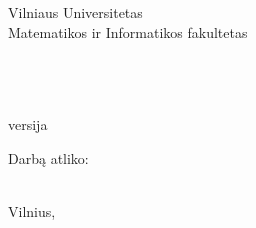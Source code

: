 \begin{titlepage}
    \begin{center}

        {\large
            Vilniaus Universitetas \\
            Matematikos ir Informatikos fakultetas \\
             \\
        }

        \vspace{\fill}

        {\huge
        } \\[0.5cm]
        {\large
             \\
            \versionString{} versija
        }

        \vspace{3cm}

        \begin{flushright}
            \begin{minipage}{0.4\textwidth}
                Darbą atliko: \\
                 \\
            \end{minipage}
        \end{flushright}

        \vspace{\fill}

        {\large Vilnius, \the\year}

    \end{center}
\end{titlepage}
